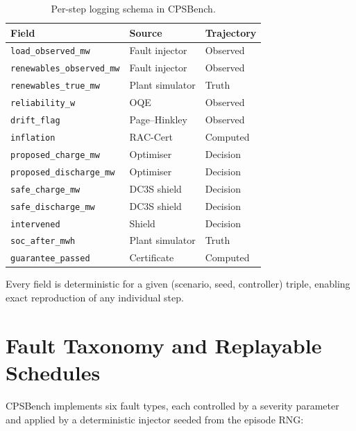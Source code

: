 \begin{table}[ht]
\centering
\caption{Per-step logging schema in CPSBench.}
\label{tab:cpsbench-log-schema}
\begin{tabular}{lll}
\toprule
\textbf{Field} & \textbf{Source} & \textbf{Trajectory} \\
\midrule
\texttt{load\_observed\_mw}    & Fault injector   & Observed \\
\texttt{renewables\_observed\_mw} & Fault injector & Observed \\
\texttt{renewables\_true\_mw}  & Plant simulator  & Truth \\
\texttt{reliability\_w}        & OQE              & Observed \\
\texttt{drift\_flag}           & Page--Hinkley    & Observed \\
\texttt{inflation}             & RAC-Cert         & Computed \\
\texttt{proposed\_charge\_mw}  & Optimiser        & Decision \\
\texttt{proposed\_discharge\_mw} & Optimiser      & Decision \\
\texttt{safe\_charge\_mw}      & DC3S shield      & Decision \\
\texttt{safe\_discharge\_mw}   & DC3S shield      & Decision \\
\texttt{intervened}            & Shield           & Decision \\
\texttt{soc\_after\_mwh}       & Plant simulator  & Truth \\
\texttt{guarantee\_passed}     & Certificate      & Computed \\
\bottomrule
\end{tabular}
\end{table}

Every field is deterministic for a given (scenario, seed, controller)
triple, enabling exact reproduction of any individual step.

\section{Fault Taxonomy and Replayable Schedules}

CPSBench implements six fault types, each controlled by a severity parameter
and applied by a deterministic injector seeded from the episode RNG:

